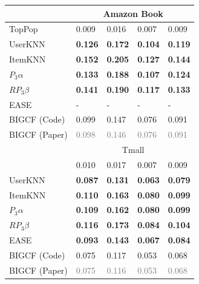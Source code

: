 \documentclass[sigconf,natbib=true,nonacm]{acmart}
\begin{document}
\begin{table}[ht!]
\begin{tabular}{l l l l l }
        \multirow{2}{*}{} & \multicolumn{4}{c}{Amazon Book} \\ \hline
        TopPop              & 0.009                &   0.016                   & 0.007                 & 0.009                    \\
        UserKNN                 & \textbf{0.126}       & \textbf{0.172}            & \textbf{0.104}        & \textbf{0.119}            \\
        ItemKNN                 & \textbf{0.152}       & \textbf{0.205}            & \textbf{0.127}        &  \textbf{0.144}           \\
        $P_{3}\alpha$           & \textbf{0.133}       & \textbf{0.188}            & \textbf{0.107}        & \textbf{0.124}            \\
        $RP_{3}\beta$           & \textbf{0.141}       & \textbf{0.190}            & \textbf{0.117}        &  \textbf{0.133}           \\
        EASE                    &  -                   &    -                      &  -                    &     -        \\ \hline
        BIGCF  (Code)                 & 0.099	               & 0.147	                   & 0.076	               &   0.091          \\
        BIGCF (Paper)  & \textcolor{gray}{0.098} & \textcolor{gray}{0.146} & \textcolor{gray}{0.076} & \textcolor{gray}{0.091}         \\ %

        \multirow{2}{*}{} & \multicolumn{4}{c}{Tmall} \\ \hline
        TopPop              & 0.010                & 0.017                     & 0.007                 & 0.009            \\
        UserKNN                 & \textbf{0.087}       & \textbf{0.131}            & \textbf{0.063}        & \textbf{0.079}     \\
        ItemKNN                 & \textbf{0.110}       & \textbf{0.163}            & \textbf{0.080}        & \textbf{0.099}       \\
        $P_{3}\alpha$           & \textbf{0.109}       & \textbf{0.162}            & \textbf{0.080}        & \textbf{0.099}            \\
        $RP_{3}\beta$           & \textbf{0.116}       & \textbf{0.173}            & \textbf{0.084}        & \textbf{0.104}           \\
        EASE                    &  \textbf{0.093}      & \textbf{0.143}            & \textbf{0.067}        & \textbf{0.084}            \\ \hline
        BIGCF  (Code)                 & 0.075	               & 0.117	                   &  0.053	               & 0.068             \\
        BIGCF (Paper)           & \textcolor{gray}{0.075}               & \textcolor{gray}{0.116}                    & \textcolor{gray}{0.053}                & \textcolor{gray}{0.068}\\

    \end{tabular}
\end{table}
\end{document}
